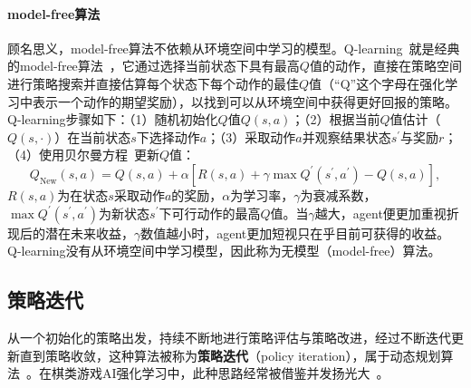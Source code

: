 \paragraph{model-free算法}
顾名思义，model-free算法不依赖从环境空间中学习的模型。Q-learning~\cite{vanHasselt2012}就是经典的model-free算法~\cite{Sutton1998,tdgam,TechnicalNote}，它通过选择当前状态下具有最高$Q$值的动作，直接在策略空间进行策略搜索并直接估算每个状态下每个动作的最佳$Q$值（“Q”这个字母在强化学习中表示一个动作的期望奖励），以找到可以从环境空间中获得更好回报的策略。
Q-learning步骤如下：（1）随机初始化$Q$值$Q(s,a)$；（2）根据当前$Q$值估计（$Q(s,\cdot)$）在当前状态$s$下选择动作$a$；（3）采取动作$a$并观察结果状态$s^{\prime}$与奖励$r$；（4）使用贝尔曼方程~\cite{dixit1990optimization}更新$Q$值：
\begin{equation*}
  Q_{\text{New}}(s,a) = Q(s,a) + \alpha[R(s,a) + \gamma \max Q^{\prime}(s^{\prime},a^{\prime}) - Q(s,a)],
\end{equation*}
$R(s,a)$为在状态$s$采取动作$a$的奖励，$\alpha$为学习率，$\gamma$为衰减系数，$\max Q^{\prime}(s^{\prime},a^{\prime})$为新状态$s^{\prime}$下可行动作的最高$Q$值。当$\gamma$越大，agent便更加重视折现后的潜在未来收益，$\gamma$数值越小时，agent更加短视只在乎目前可获得的收益。
Q-learning没有从环境空间中学习模型，因此称为无模型（model-free）算法。

\subsection{策略迭代}
从一个初始化的策略出发，持续不断地进行策略评估与策略改进，经过不断迭代更新直到策略收敛，这种算法被称为\textbf{策略迭代}（policy iteration），属于动态规划算法~\cite{Sutton1998}。在棋类游戏AI强化学习中，此种思路经常被借鉴并发扬光大~\cite{Silver1140,Silver2017,Silver2016}。
